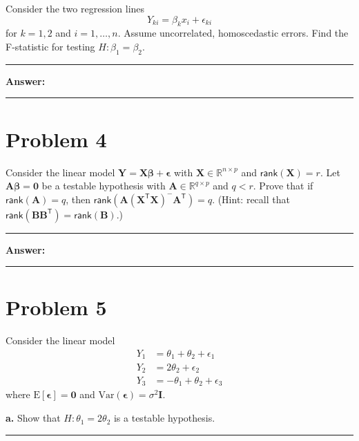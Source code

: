 \documentclass[
]{article}
\newcommand{\bmA}{\ensuremath{\bm A}}
\newcommand{\bmB}{\ensuremath{\bm B}}
\newcommand{\bmI}{\ensuremath{\bm I}}
\newcommand{\bmX}{\ensuremath{\bm X}}
\newcommand{\bmY}{\ensuremath{\bm Y}}
\newcommand{\bmbeta}{\ensuremath{\bm{\beta}}}
\newcommand{\bmepsilon}{\ensuremath{\bm{\epsilon}}}
\newcommand{\rank}{\ensuremath{\mathsf{rank}}}
\newcommand{\mT}{\ensuremath{\mathsf{T}}}
\newcommand{\XtX}{\ensuremath{\bmX^\mT\bmX}}
\newcommand{\E}{\ensuremath{\mathrm{E}}}
\newcommand{\Var}{\ensuremath{\mathrm{Var}}}
\begin{document}
Consider the two regression lines
\[Y_{ki} = \beta_kx_i + \epsilon_{ki}\] for \(k=1, 2\) and
\(i=1, \dots, n\). Assume uncorrelated, homoscedastic errors. Find the
F-statistic for testing \(H : \beta_1 = \beta_2\).

\begin{center}\rule{0.5\linewidth}{0.5pt}\end{center}

\textbf{Answer:}

\begin{center}\rule{0.5\linewidth}{0.5pt}\end{center}

\hypertarget{problem-4}{%
\section{Problem 4}\label{problem-4}}

Consider the linear model \(\bmY = \bmX\bmbeta + \bmepsilon\) with
\(\bmX \in \mathbb{R}^{n \times p}\) and \(\rank(\bmX) = r\). Let
\(\bmA\bmbeta = \bm0\) be a testable hypothesis with
\(\bmA \in \mathbb{R}^{q \times p}\) and \(q < r\). Prove that if
\(\rank(\bmA) = q\), then \(\rank(\bmA(\XtX)^{-}\bmA^\mT) = q\). (Hint:
recall that \(\rank(\bmB\bmB^\mT) = \rank(\bmB)\).)

\begin{center}\rule{0.5\linewidth}{0.5pt}\end{center}

\textbf{Answer:}

\begin{center}\rule{0.5\linewidth}{0.5pt}\end{center}

\hypertarget{problem-5}{%
\section{Problem 5}\label{problem-5}}

Consider the linear model \begin{align*}
Y_1 &= \theta_1 + \theta_2 + \epsilon_1\\
Y_2 &= 2\theta_2 + \epsilon_2\\
Y_3 &= -\theta_1 + \theta_2 + \epsilon_3
\end{align*} where \(\E[\bmepsilon] = \bm0\) and
\(\Var(\bmepsilon) = \sigma^2\bmI\).

\textbf{a.} Show that \(H : \theta_1 = 2\theta_2\) is a testable
hypothesis.

\begin{center}\rule{0.5\linewidth}{0.5pt}\end{center}
\end{document}

